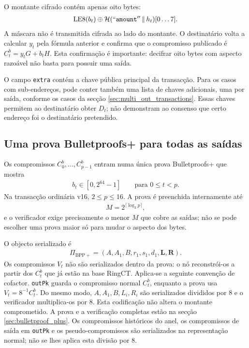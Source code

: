 %
O montante cifrado contém apenas oito bytes:
\begin{align*}
 \operatorname{LE8}(b_t)\mathbin\oplus
 \mathcal H(``\texttt{amount}''\,\|\,h_t)[0\ldots7].
\end{align*}
A máscara não é transmitida cifrada ao lado do montante. O destinatário volta a
calcular \(y_t\) pela fórmula anterior e confirma que o compromisso publicado
é \(C^b_t=y_tG+b_tH\). Esta confirmação é importante:
decifrar oito bytes com aspecto razoável não basta para possuir uma saída.


O campo \texttt{extra} contém a chave pública principal da transacção.
Para os casos com sub-endereços, pode conter também uma lista de
chaves adicionais, uma por saída, conforme os casos da secção
\ref{sec:multi_out_transactions}. Essas chaves permitem ao destinatário
obter \(D_t\); não demonstram ao consenso que certo endereço foi o
destinatário pretendido.


\subsection{Uma prova Bulletproofs+ para todas as saídas}

Os compromissos \(C^b_0,\ldots,C^b_{p-1}\) entram numa única prova
Bulletproofs+ que mostra
\begin{align*}
 b_t\in[0,2^{64}-1]\qquad\text{para }0\leq t<p.
\end{align*}
Na transacção ordinária v16, \(2\leq p\leq16\). A prova é preenchida
internamente até
\begin{align*}
 M=2^{\lceil\log_2p\rceil},
\end{align*}
e o verificador exige precisamente o menor \(M\) que cobre as saídas; não se
pode escolher uma prova maior só para mudar o aspecto dos bytes.

%
O objecto serializado é
\begin{align*}
 \Pi_{\mathrm{BPP+}}=
 (A,A_1,B,r_1,s_1,d_1,\mathbf L,\mathbf R).
\end{align*}
Os compromissos \(V_t\) não são serializados dentro da prova: o nó
reconstrói-os a partir dos \(C^b_t\) que já estão na base RingCT. Aplica-se a
seguinte convenção de cofactor. \texttt{outPk} guarda o
compromisso normal \(C^b_t\), enquanto a prova usa
\(V_t=8^{-1}C^b_t\). Do mesmo modo, \(A,A_1,B,L_i,R_i\) são serializados
divididos por 8 e o verificador multiplica-os por 8. Esta codificação não
altera o montante comprometido. A prova e a verificação completas estão na
secção \ref{sec:bulletproof_plus}. Os compromissos históricos do anel, os
compromissos de saída em \texttt{outPk} e os pseudo-compromissos são
serializados na representação normal; não se lhes aplica esta divisão por 8.



